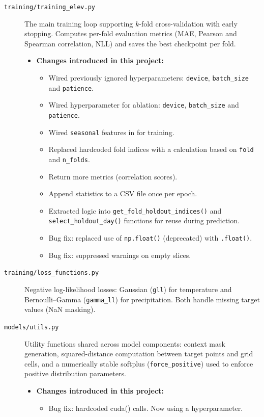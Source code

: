 \begin{description}
  \item[\texttt{training/training\_elev.py}] The main training loop supporting $k$-fold cross-validation with early stopping. Computes per-fold evaluation metrics (MAE, Pearson and Spearman correlation, NLL) and saves the best checkpoint per fold. \nopagebreak
    \begin{itemize} \nopagebreak
      \item[] \textbf{Changes introduced in this project:}
      \begin{itemize}
          \item Wired previously ignored hyperparameters: \texttt{device}, \texttt{batch\_size} and \texttt{patience}.
          \item Wired hyperparameter for ablation: \texttt{device}, \texttt{batch\_size} and \texttt{patience}.
          \item Wired \texttt{seasonal} features in for training.
          \item Replaced hardcoded fold indices with a calculation based on \texttt{fold} and \texttt{n\_folds}.
          \item Return more metrics (correlation scores).
          \item Append statistics to a CSV file once per epoch.
          \item Extracted logic into \texttt{get\_fold\_holdout\_indices()} and \texttt{select\_holdout\_day()} functions for reuse during prediction.
          \item Bug fix: replaced use of \texttt{np.float()} (deprecated) with \texttt{.float()}.
          \item Bug fix: suppressed warnings on empty slices.
      \end{itemize}
  \end{itemize} 

  \item[\texttt{training/loss\_functions.py}] Negative log-likelihood losses: Gaussian (\texttt{gll}) for temperature and Bernoulli--Gamma (\texttt{gamma\_ll}) for precipitation.
  Both handle missing target values (NaN masking).

  \item[\texttt{models/utils.py}] Utility functions shared across model components: context mask generation, squared-distance computation between target points and grid cells, and a numerically stable softplus (\texttt{force\_positive}) used to enforce positive distribution parameters.
  \begin{itemize}
      \item[] \textbf{Changes introduced in this project:}
      \begin{itemize}
          \item Bug fix: hardcoded cuda() calls. Now using a hyperparameter.
      \end{itemize}
  \end{itemize} 


\end{description}
